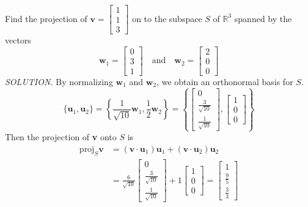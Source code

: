 \documentclass{article}
\newcommand\B{\textbf}
\newcommand\R{\mathbb{R}}
\newcommand\T{\textit}
\begin{document}
    Find the projection of $\B{v} = \begin{bmatrix}
        1 \\ 1 \\ 3
    \end{bmatrix}$ on to the subspace $S$ of $\R^3$ spanned by the vectors 
    \[  \B{w}_1 = \begin{bmatrix}
        0 \\ 3 \\ 1
    \end{bmatrix} \quad \text{and} \quad \B{w}_2 =
    \begin{bmatrix}
        2 \\ 0 \\ 0
    \end{bmatrix} \]
    \T{\textcolor{blue5}{SOLUTION.}} By normalizing $\B{w}_1$ and $\B{w}_2$, we obtain an orthonormal basis for $S$.
    \[ \{ \B{u}_1, \B{u}_2 \} = \left\{ \frac{1}{\sqrt{10}}\B{w}_1, \frac{1}{2}\B{w}_2 \right\} =
        \left\{ \begin{bmatrix}
            0 \\
            \frac{3}{\sqrt{10}} \\
            \frac{1}{\sqrt{10}}
        \end{bmatrix}, 
        \begin{bmatrix}
            1 \\ 0 \\ 0
        \end{bmatrix} \right\} \]
    Then the projection of \B{v} onto $S$ is
    \begin{equation*}
        \begin{split}
            \text{proj}_S\B{v} & = (\B{v} \cdot \B{u}_1) \B{u}_1 + (\B{v} \cdot \B{u}_2) \B{u}_2 \\
                               & = \frac{6}{\sqrt{10}} \begin{bmatrix}
            0 \\
            \frac{3}{\sqrt{10}} \\
            \frac{1}{\sqrt{10}}
        \end{bmatrix} + 1 \begin{bmatrix}
            1 \\ 0 \\ 0
        \end{bmatrix} = \begin{bmatrix}
            1 \\
            \frac{9}{5} \\
            \frac{3}{3}
        \end{bmatrix} 
        \end{split} 
    \end{equation*}
    
\end{document}
